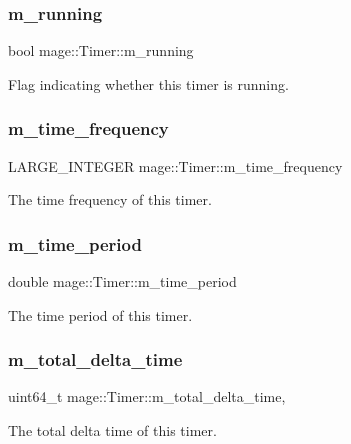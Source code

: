 \subsubsection{\texorpdfstring{m\+\_\+running}{m\_running}}
{\footnotesize\ttfamily bool mage\+::\+Timer\+::m\+\_\+running\hspace{0.3cm}{\ttfamily [private]}}

Flag indicating whether this timer is running. \hypertarget{classmage_1_1_timer_a64e9afd31a95058e1736e84122c663d3}{}\label{classmage_1_1_timer_a64e9afd31a95058e1736e84122c663d3} 
\subsubsection{\texorpdfstring{m\+\_\+time\+\_\+frequency}{m\_time\_frequency}}
{\footnotesize\ttfamily L\+A\+R\+G\+E\+\_\+\+I\+N\+T\+E\+G\+ER mage\+::\+Timer\+::m\+\_\+time\+\_\+frequency\hspace{0.3cm}{\ttfamily [private]}}

The time frequency of this timer. \hypertarget{classmage_1_1_timer_a577257c9664421250f5b060eb7cf63fa}{}\label{classmage_1_1_timer_a577257c9664421250f5b060eb7cf63fa} 
\subsubsection{\texorpdfstring{m\+\_\+time\+\_\+period}{m\_time\_period}}
{\footnotesize\ttfamily double mage\+::\+Timer\+::m\+\_\+time\+\_\+period\hspace{0.3cm}{\ttfamily [private]}}

The time period of this timer. \hypertarget{classmage_1_1_timer_a7831a92c4f3b4a3190d26250fd069b75}{}\label{classmage_1_1_timer_a7831a92c4f3b4a3190d26250fd069b75} 
\subsubsection{\texorpdfstring{m\+\_\+total\+\_\+delta\+\_\+time}{m\_total\_delta\_time}}
{\footnotesize\ttfamily uint64\+\_\+t mage\+::\+Timer\+::m\+\_\+total\+\_\+delta\+\_\+time\hspace{0.3cm}{\ttfamily [mutable]}, {\ttfamily [private]}}

The total delta time of this timer. 